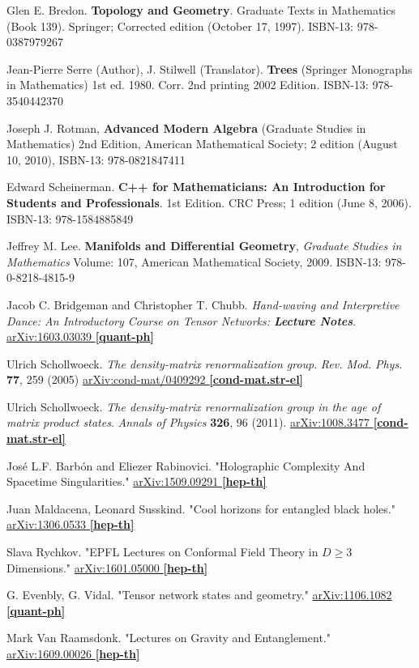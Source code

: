 \documentclass[10pt]{amsart}
\begin{document}
\begin{thebibliography}{9}
Glen E. Bredon.  \textbf{Topology and Geometry}. Graduate Texts in Mathematics (Book 139).  Springer; Corrected edition (October 17, 1997).  ISBN-13: 978-0387979267


Jean-Pierre Serre (Author), J. Stilwell (Translator).  \textbf{Trees} (Springer Monographs in Mathematics) 1st ed. 1980. Corr. 2nd printing 2002 Edition.  ISBN-13: 978-3540442370

Joseph J. Rotman, \textbf{Advanced Modern Algebra} (Graduate Studies in Mathematics) 2nd Edition, American Mathematical Society; 2 edition (August 10, 2010), ISBN-13: 978-0821847411

Edward Scheinerman.  \textbf{C++ for Mathematicians: An Introduction for Students and Professionals}. 1st Edition.  CRC Press; 1 edition (June 8, 2006).  ISBN-13: 978-1584885849 


Jeffrey M. Lee. \textbf{Manifolds and Differential Geometry}, \emph{Graduate Studies in Mathematics} Volume: 107, American Mathematical Society, 2009. ISBN-13: 978-0-8218-4815-9

Jacob C. Bridgeman and Christopher T. Chubb.  \emph{Hand-waving and Interpretive Dance: An Introductory Course on Tensor Networks: \textbf{Lecture Notes}}.  \href{https://arxiv.org/abs/1603.03039}{arXiv:1603.03039 \textbf{[quant-ph]}}

Ulrich Schollwoeck.  \emph{The density-matrix renormalization group}.   \emph{Rev. Mod. Phys.} \textbf{77}, 259 (2005)	\href{https://arxiv.org/abs/cond-mat/0409292}{arXiv:cond-mat/0409292 \textbf{[cond-mat.str-el]}}

Ulrich Schollwoeck.  \emph{The density-matrix renormalization group in the age of matrix product states}.  \emph{Annals of Physics} \textbf{326}, 96 (2011).  \href{https://arxiv.org/abs/1008.3477}{arXiv:1008.3477 \textbf{[cond-mat.str-el]}}

Jos\'{e} L.F. Barb\'{o}n and Eliezer Rabinovici.  "Holographic Complexity And Spacetime Singularities."  \href{https://arxiv.org/abs/1509.09291v3}{arXiv:1509.09291 \textbf{[hep-th]}}

Juan Maldacena, Leonard Susskind.  "Cool horizons for entangled black holes."  \href{https://arxiv.org/abs/1306.0533}{ 	arXiv:1306.0533 \textbf{[hep-th]}}

Slava Rychkov.  "EPFL Lectures on Conformal Field Theory in $D \geq 3$ Dimensions."    \href{https://arxiv.org/abs/1601.05000}{arXiv:1601.05000 \textbf{[hep-th]}}

G. Evenbly, G. Vidal.  "Tensor network states and geometry."  \href{https://arxiv.org/abs/1106.1082}{arXiv:1106.1082 \textbf{[quant-ph]}}

Mark Van Raamsdonk.  "Lectures on Gravity and Entanglement."  \href{https://arxiv.org/abs/1609.00026}{arXiv:1609.00026 \textbf{[hep-th]}}

\end{thebibliography}
\end{document}
